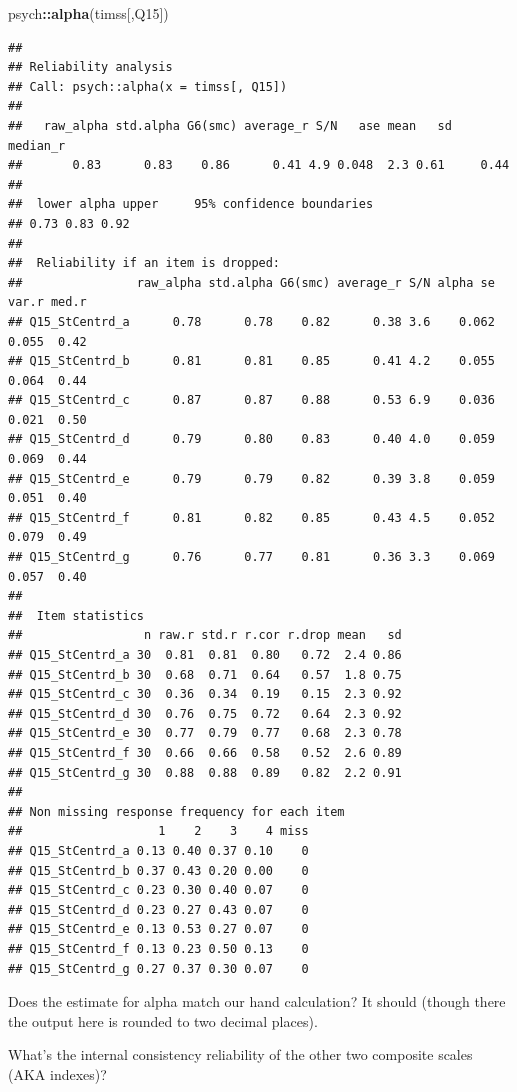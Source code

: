 \documentclass[
]{article}
\newenvironment{Shaded}{\begin{snugshade}}{\end{snugshade}}
\newcommand{\KeywordTok}[1]{\textcolor[rgb]{0.13,0.29,0.53}{\textbf{#1}}}
\newcommand{\NormalTok}[1]{#1}
\newcommand{\OperatorTok}[1]{\textcolor[rgb]{0.81,0.36,0.00}{\textbf{#1}}}
\begin{document}
\begin{Shaded}
\begin{Highlighting}[]
\NormalTok{psych}\OperatorTok{::}\KeywordTok{alpha}\NormalTok{(timss[,Q15])}
\end{Highlighting}
\end{Shaded}

\begin{verbatim}
## 
## Reliability analysis   
## Call: psych::alpha(x = timss[, Q15])
## 
##   raw_alpha std.alpha G6(smc) average_r S/N   ase mean   sd median_r
##       0.83      0.83    0.86      0.41 4.9 0.048  2.3 0.61     0.44
## 
##  lower alpha upper     95% confidence boundaries
## 0.73 0.83 0.92 
## 
##  Reliability if an item is dropped:
##                raw_alpha std.alpha G6(smc) average_r S/N alpha se var.r med.r
## Q15_StCentrd_a      0.78      0.78    0.82      0.38 3.6    0.062 0.055  0.42
## Q15_StCentrd_b      0.81      0.81    0.85      0.41 4.2    0.055 0.064  0.44
## Q15_StCentrd_c      0.87      0.87    0.88      0.53 6.9    0.036 0.021  0.50
## Q15_StCentrd_d      0.79      0.80    0.83      0.40 4.0    0.059 0.069  0.44
## Q15_StCentrd_e      0.79      0.79    0.82      0.39 3.8    0.059 0.051  0.40
## Q15_StCentrd_f      0.81      0.82    0.85      0.43 4.5    0.052 0.079  0.49
## Q15_StCentrd_g      0.76      0.77    0.81      0.36 3.3    0.069 0.057  0.40
## 
##  Item statistics 
##                 n raw.r std.r r.cor r.drop mean   sd
## Q15_StCentrd_a 30  0.81  0.81  0.80   0.72  2.4 0.86
## Q15_StCentrd_b 30  0.68  0.71  0.64   0.57  1.8 0.75
## Q15_StCentrd_c 30  0.36  0.34  0.19   0.15  2.3 0.92
## Q15_StCentrd_d 30  0.76  0.75  0.72   0.64  2.3 0.92
## Q15_StCentrd_e 30  0.77  0.79  0.77   0.68  2.3 0.78
## Q15_StCentrd_f 30  0.66  0.66  0.58   0.52  2.6 0.89
## Q15_StCentrd_g 30  0.88  0.88  0.89   0.82  2.2 0.91
## 
## Non missing response frequency for each item
##                   1    2    3    4 miss
## Q15_StCentrd_a 0.13 0.40 0.37 0.10    0
## Q15_StCentrd_b 0.37 0.43 0.20 0.00    0
## Q15_StCentrd_c 0.23 0.30 0.40 0.07    0
## Q15_StCentrd_d 0.23 0.27 0.43 0.07    0
## Q15_StCentrd_e 0.13 0.53 0.27 0.07    0
## Q15_StCentrd_f 0.13 0.23 0.50 0.13    0
## Q15_StCentrd_g 0.27 0.37 0.30 0.07    0
\end{verbatim}

Does the estimate for alpha match our hand calculation? It should (though there the output here is rounded to two decimal places).

What's the internal consistency reliability of the other two composite scales (AKA indexes)?
\end{document}
